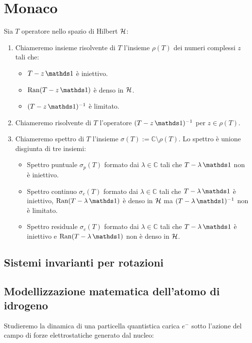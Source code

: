 \chapter{Monaco}

\begin{definition}
    Sia $T$ operatore nello spazio di Hilbert $\operatorname{\mathcal{H}}$:
\begin{enumerate}
    \item Chiameremo insieme risolvente di $T$ l'insieme $\rho(T)$ dei numeri complessi $z$ tali che:
    \begin{itemize}
        \item $T-z\un$ è iniettivo.
        \item $\Ran(T- z \un)$ è denso in $\operatorname{\mathcal{H}}$.
        \item $(T-z\un)^{-1}$ è limitato.
    \end{itemize}
    \item Chiameremo risolvente di $T$ l'operatore $(T-z\un)^{-1}$ per $z \in \rho(T)$.
    \item Chiameremo spettro di $T$ l'insieme $\sigma(T) := \mathbb{C} \setminus \rho(T)$. Lo spettro è unione disgiunta di tre insiemi:
    \begin{itemize}
        \item Spettro puntuale $\sigma_p(T)$ formato dai $\lambda \in \mathbb{C}$ tali che $T-\lambda \un$ non è iniettivo.
        \item Spettro continuo $\sigma_c(T)$ formato dai $\lambda \in \mathbb{C}$ tali che $T-\lambda \un$ è iniettivo, $\Ran(T-\lambda \un)$ è denso in $\operatorname{\mathcal{H}}$ ma $(T-\lambda \un)^{-1}$ non è limitato.
        \item Spettro residuale $\sigma_c(T)$ formato dai $\lambda \in \mathbb{C}$ tali che $T-\lambda \un$ è iniettivo e $\Ran(T-\lambda \un)$ non è denso in $\operatorname{\mathcal{H}}$.
    \end{itemize}
\end{enumerate}
\end{definition}


\section{Sistemi invarianti per rotazioni}


\section*{Modellizzazione matematica dell'atomo di idrogeno}
Studieremo la dinamica di una particella quantistica carica $e^-$ sotto l'azione del campo di forze elettrostatiche generato dal nucleo: 

